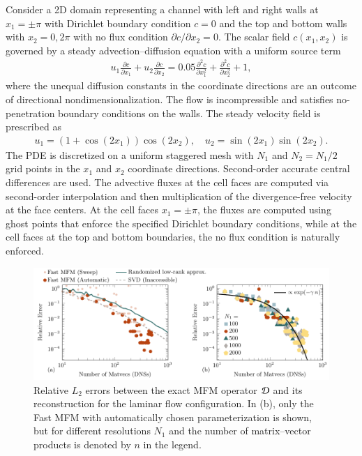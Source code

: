 Consider a 2D domain representing a channel with left and right walls at $x_1 = \pm \pi$ with Dirichlet boundary condition $c = 0$ and the top and bottom walls with $x_2 = 0,2\pi$ with no flux condition $\partial c/\partial x_2 = 0$.
The scalar field $c(x_1,x_2)$ is governed by a steady advection--diffusion equation with a uniform source term
\begin{gather}
    u_1 \frac{\partial c}{\partial x_1} + u_2 \frac{\partial c}{\partial x_2} = 0.05 \frac{\partial^2 c}{\partial x_1^2} + \frac{\partial^2 c}{\partial x_2^2} + 1,
\end{gather}
where the unequal diffusion constants in the coordinate directions are an outcome of directional nondimensionalization.
The flow is incompressible and satisfies no-penetration boundary conditions on the walls. 
The steady velocity field is prescribed as
\begin{gather}
    u_1 = (1 + \cos(2 x_1))\cos(2 x_2), \quad u_2 =\sin(2 x_1)\sin(2 x_2).
\end{gather}
The PDE is discretized on a uniform staggered mesh with $N_1$ and $N_2 = N_1/2$ grid points in the $x_1$ and $x_2$ coordinate directions. 
Second-order accurate central differences are used. 
The advective fluxes at the cell faces are computed via second-order interpolation and then multiplication of the divergence-free velocity at the face centers.
At the cell faces $x_1=\pm \pi$, the fluxes are computed using ghost points that enforce the specified Dirichlet boundary conditions, while at the cell faces at the top and bottom boundaries, the no flux condition is naturally enforced. 

\begin{figure}
    \centering
    \includegraphics[scale=1]{figures/err-peel-laminar.pdf}
    \caption{
        Relative $L_2$ errors between the exact MFM operator $\mathcal{D}$ and its reconstruction for the laminar flow configuration.
        In (b), only the Fast MFM with automatically chosen parameterization is shown, but for different resolutions $N_1$ and the number of matrix--vector products is denoted by $n$ in the legend.
    }
    \label{f:error_peeeling_lam}
\end{figure}

